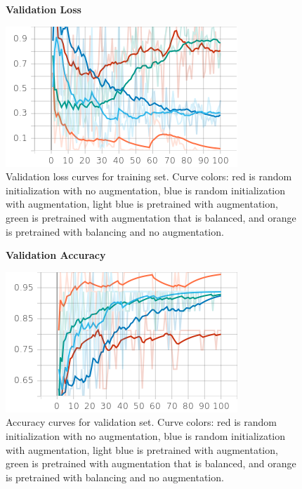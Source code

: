 \documentclass[10pt,twocolumn,letterpaper]{article}
\begin{document}
\begin{figure}[h]
   \begin{center}
      \textbf{Validation Loss}\par\medskip
      \includegraphics[width=0.95\linewidth]{images/loss-val.png}
   \end{center}
   \caption{Validation loss curves for training set. Curve colors: red is random initialization with no augmentation, blue is random initialization with augmentation, light blue is pretrained with augmentation, green is pretrained with augmentation that is balanced, and orange is pretrained with balancing and no augmentation.}
\label{fig:fig4}
\end{figure}

\begin{figure}[h]
   \begin{center}
      \textbf{Validation Accuracy}\par\medskip
      \includegraphics[width=0.95\linewidth]{images/accuracy-val.png}
   \end{center}
   \caption{Accuracy curves for validation set. Curve colors: red is random initialization with no augmentation, blue is random initialization with augmentation, light blue is pretrained with augmentation, green is pretrained with augmentation that is balanced, and orange is pretrained with balancing and no augmentation.}
\label{fig:fig5}
\end{figure}
\end{document}

